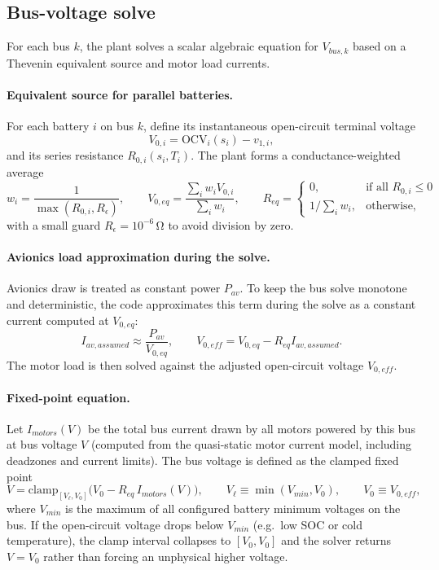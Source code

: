 \subsection{Bus-voltage solve}
\label{sec:bus-solve}

For each bus $k$, the plant solves a scalar algebraic equation for $V_{bus,k}$ based on a Thevenin equivalent source and motor load currents.

\paragraph{Equivalent source for parallel batteries.}
For each battery $i$ on bus $k$, define its instantaneous open-circuit terminal voltage
\begin{equation}
  V_{0,i} = \mathrm{OCV}_i(s_i) - v_{1,i},
\end{equation}
and its series resistance $R_{0,i}(s_i,T_i)$. The plant forms a conductance-weighted average
\begin{equation}
  w_i = \frac{1}{\max(R_{0,i}, R_{\epsilon})},\qquad
  V_{0,eq} = \frac{\sum_i w_i V_{0,i}}{\sum_i w_i},\qquad
  R_{eq} = \begin{cases}
    0, & \text{if all }R_{0,i}\le 0 \\
    1/\sum_i w_i, & \text{otherwise,}
  \end{cases}
\end{equation}
with a small guard $R_{\epsilon}=10^{-6}\,\si{\ohm}$ to avoid division by zero.

\paragraph{Avionics load approximation during the solve.}
Avionics draw is treated as constant power $P_{av}$. To keep the bus solve monotone and deterministic, the code approximates this term during the solve as a constant current computed at $V_{0,eq}$:
\begin{equation}
  I_{av,assumed} \approx \frac{P_{av}}{V_{0,eq}},\qquad V_{0,eff} = V_{0,eq} - R_{eq} I_{av,assumed}.
\end{equation}
The motor load is then solved against the adjusted open-circuit voltage $V_{0,eff}$.

\paragraph{Fixed-point equation.}
Let $I_{motors}(V)$ be the total bus current drawn by all motors powered by this bus at bus voltage $V$ (computed from the quasi-static motor current model, including deadzones and current limits). The bus voltage is defined as the clamped fixed point
\begin{equation}
  V = \mathrm{clamp}_{[V_{\ell}, V_0]}\bigl(V_0 - R_{eq}\,I_{motors}(V)\bigr),\qquad
  V_{\ell}\equiv \min(V_{min}, V_0),\qquad V_0\equiv V_{0,eff},
\end{equation}
where $V_{min}$ is the maximum of all configured battery minimum voltages on the bus. If the open-circuit voltage drops below $V_{min}$ (e.g.\ low SOC or cold temperature), the clamp interval collapses to $[V_0, V_0]$ and the solver returns $V=V_0$ rather than forcing an unphysical higher voltage.

